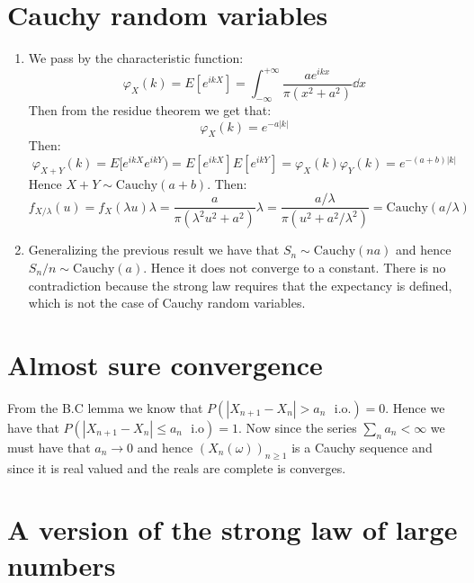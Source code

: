 \documentclass[10pt,a4paper]{book}
\begin{document}
\section{Cauchy random variables}
\begin{enumerate}

\item We pass by the characteristic function:
\[
\varphi_X(k) = E[e^{ikX}] = \int_{-\infty}^{+\infty} \frac{a e^{i k x}}{\pi(x^2 + a^2)} \dd x
\]
Then from the residue theorem we get that:
\[
\varphi_X(k) = e^{-a |k|}
\]
Then:
\[
\varphi_{X+Y}(k) = E[e^{ik X} e^{ik Y}) = E[e^{ik X}]E[e^{ik Y}] = \varphi_X(k) \varphi_Y(k) = e^{-(a+b)|k|}
\]
Hence $X + Y \sim \text{Cauchy}(a+b)$. 
Then:
\[
f_{X/\lambda}(u) = f_X(\lambda u)\lambda = \frac{a}{\pi(\lambda^2 u^2 + a^2)} \lambda = \frac{a/\lambda}{\pi(u^2 + a^2/\lambda^2)} = \text{Cauchy}(a/\lambda)
\]

\item Generalizing the previous result we have that $S_n \sim \text{Cauchy}(na)$ and hence $S_n/n \sim \text{Cauchy}(a)$. Hence it does not converge to a constant. There is no contradiction because the strong law requires that the expectancy is defined, which is not the case of Cauchy random variables.

\end{enumerate}

\section{Almost sure convergence}

From the B.C lemma we know that $P(|X_{n+1} - X_n| > a_n \mbox{~~i.o.}) = 0$. Hence we have that $P(|X_{n+1} - X_n| \leq a_n \mbox{~~i.o}) = 1.$ Now since the series $\sum_n a_n < \infty$ we must have that $a_n \to 0$ and hence $(X_n(\omega))_{n \geq 1}$ is a Cauchy sequence and since it is real valued and the reals are complete is converges. 

\section{A version of the strong law of large numbers}
\end{document}
